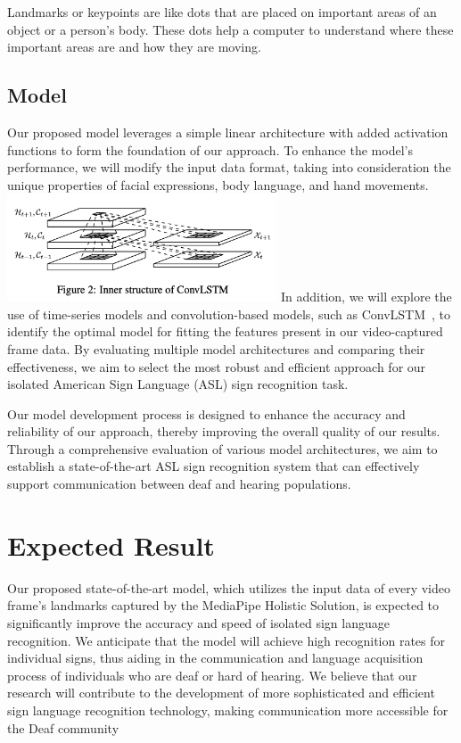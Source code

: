 \documentclass[10pt,twocolumn,letterpaper]{article}
\begin{document}
\begin{CJK*}{UTF8}{bsmi}
Landmarks or keypoints are like dots that are placed on important areas of an object or a person's body. 
These dots help a computer to understand where these important areas are and how they are moving.

\subsection{Model}

Our proposed model leverages a simple linear architecture with added activation functions to form 
the foundation of our approach. To enhance the model's performance, we will modify the input data format, 
taking into consideration the unique properties of facial expressions, body language, and hand movements.
\includegraphics[width=80mm]{ConvLSTM}
In addition, we will explore the use of time-series models and convolution-based models, 
such as ConvLSTM~\cite{NIPS2015_07563a3f}, to identify the optimal model for fitting the features present in our video-captured frame data. 
By evaluating multiple model architectures and comparing their effectiveness, 
we aim to select the most robust and efficient approach for our isolated American Sign Language (ASL) sign recognition task.

Our model development process is designed to enhance the accuracy and reliability of our approach, 
thereby improving the overall quality of our results. 
Through a comprehensive evaluation of various model architectures, we aim to establish a state-of-the-art ASL sign recognition system 
that can effectively support communication between deaf and hearing populations.

\section{Expected Result}
Our proposed state-of-the-art model, which utilizes the input data of every video frame's landmarks captured by the MediaPipe Holistic Solution, 
is expected to significantly improve the accuracy and speed of isolated sign language recognition. 
We anticipate that the model will achieve high recognition rates for individual signs, 
thus aiding in the communication and language acquisition process of individuals who are deaf or hard of hearing. 
We believe that our research will contribute to the development of more sophisticated and efficient sign language recognition technology, 
making communication more accessible for the Deaf community




{\small


}

\end{CJK*}
\end{document}
